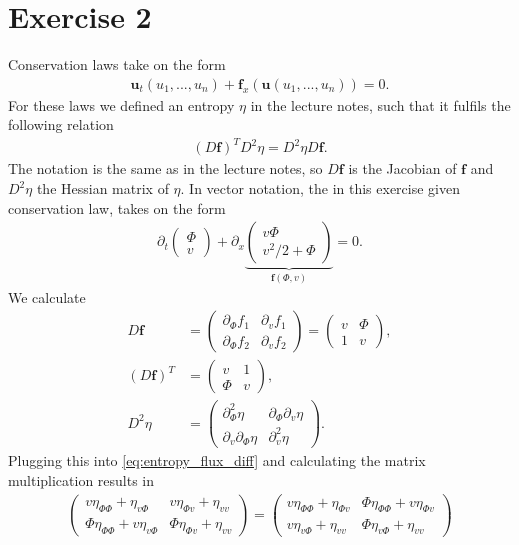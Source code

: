 \section{Exercise 2}
Conservation laws take on the form
\begin{align}
\bm u_t(u_1,...,u_n) + \bm f_x(\bm u(u_1,...,u_n)) = 0.
\end{align}
For these laws we defined an entropy $\eta$ in the lecture notes, such that it fulfils the following relation 
\begin{align}
(D\bm f)^T D^2\eta = D^2\eta D \bm f.\label{eq:entropy_flux_diff}
\end{align}
The notation is the same as in the lecture notes, so $D \bm f$ is the Jacobian of $\bm f$ and $D^2 \eta$ the Hessian matrix of $\eta$.
In vector notation, the in this exercise given conservation law, takes on the form
\begin{align}
\partial_t
\begin{pmatrix} 
\Phi\\
v 
\end{pmatrix} +
\partial_x
\underbrace{
\begin{pmatrix} 
v\Phi\\
v^2/2 + \Phi
\end{pmatrix}}_{\bm f(\Phi, v)} = 0.
\end{align}
We calculate
\begin{align}
D\bm f &= \begin{pmatrix} \partial_\Phi f_1 & \partial_v f_1 \\ \partial_\Phi f_2 & \partial_v f_2\end{pmatrix} =  \begin{pmatrix} v & \Phi \\ 1 & v\end{pmatrix},\\
(D\bm f)^T &= \begin{pmatrix} v & 1 \\ \Phi & v\end{pmatrix},\\
D^2\eta &= \begin{pmatrix}\partial^2_\Phi \eta & \partial_\Phi\partial_v \eta\\ \partial_v \partial_\Phi\eta&\partial^2_v \eta \end{pmatrix}.
\end{align}
Plugging this into \cref{eq:entropy_flux_diff} and calculating the matrix multiplication results in
\begin{align}
\begin{pmatrix}
v\eta_{\Phi\Phi} +\eta_{v \Phi} & v\eta_{\Phi v} +\eta_{vv} \\
\Phi \eta_{\Phi\Phi} + v\eta_{v\Phi} & \Phi\eta_{\Phi v}+\eta_{v v}
\end{pmatrix}
=
\begin{pmatrix}
v\eta_{\Phi\Phi} +\eta_{\Phi v} & \Phi\eta_{\Phi\Phi} + v\eta_{\Phi v}\\
v \eta_{v\Phi} + \eta_{v v} & \Phi\eta_{ v \Phi}+\eta_{v v}
\end{pmatrix}
\end{align}
